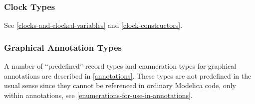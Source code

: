 \subsubsection{Clock Types}

See \cref{clocks-and-clocked-variables} and \cref{clock-constructors}.

\subsubsection{Graphical Annotation Types}

A number of ``predefined'' record types and enumeration types for graphical annotations are described in \cref{annotations}.
These types are not predefined in the usual sense since they cannot be referenced in ordinary Modelica code, only within annotations, see \cref{enumerations-for-use-in-annotations}.
